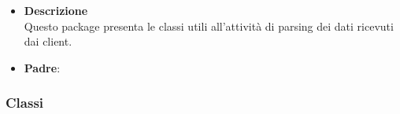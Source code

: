 \begin{itemize}
\item \textbf{Descrizione}\\
Questo package presenta le classi utili all'attività di parsing dei dati ricevuti dai client.
\item \textbf{Padre}: \hyperref[\nogloxy{swedesigner::server}]{}
\end{itemize}
\subsubsection{Classi}
\label{\nogloxy{swedesigner::server::parser::Parser}}
\begin{figure}[h]
\centering
{}
\caption{}
\end{figure}
\FloatBarrier

